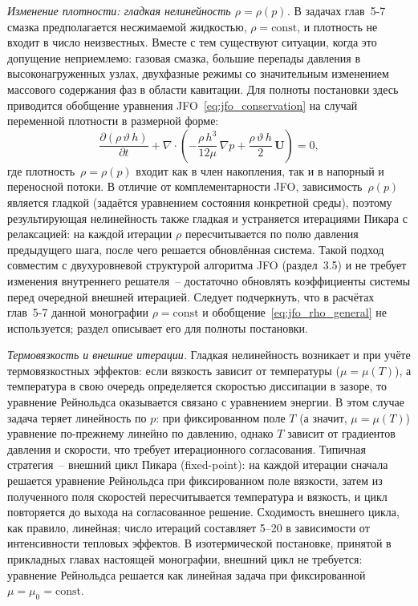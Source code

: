 \textit{Изменение плотности: гладкая нелинейность
$\rho = \rho(p)$.}
В задачах глав~5-7 смазка предполагается несжимаемой
жидкостью, $\rho = \mathrm{const}$, и плотность не входит
в число неизвестных. Вместе с тем существуют ситуации, когда
это допущение неприемлемо: газовая смазка, большие перепады
давления в высоконагруженных узлах, двухфазные режимы
со значительным изменением массового содержания фаз в области
кавитации. Для полноты постановки здесь приводится обобщение
уравнения JFO~\eqref{eq:jfo_conservation} на случай переменной
плотности в размерной форме:
\begin{equation}
  \frac{\partial (\rho\,\vartheta\,h)}{\partial t}
  + \nabla\cdot\!\left(
      -\frac{\rho\,h^3}{12\mu}\,\nabla p
      + \frac{\rho\,\vartheta\,h}{2}\,\mathbf{U}
    \right) = 0,
  \label{eq:jfo_rho_general}
\end{equation}
где плотность~$\rho = \rho(p)$ входит как в член накопления,
так и в напорный и переносной потоки. В отличие от
комплементарности JFO, зависимость~$\rho(p)$ является гладкой
(задаётся уравнением состояния конкретной среды), поэтому результирующая нелинейность также гладкая
и устраняется итерациями Пикара с релаксацией: на каждой
итерации $\rho$ пересчитывается по полю давления предыдущего
шага, после чего решается обновлённая система. Такой подход
совместим с двухуровневой структурой алгоритма JFO
(раздел~3.5) и не требует изменения внутреннего
решателя~-- достаточно обновлять коэффициенты системы перед
очередной внешней итерацией. Следует подчеркнуть, что
в расчётах глав~5-7 данной монографии
$\rho = \mathrm{const}$
и обобщение~\eqref{eq:jfo_rho_general} не используется;
раздел описывает его для полноты постановки.

\textit{Термовязкость и внешние итерации.}
Гладкая нелинейность возникает и при учёте термовязкостных
эффектов: если вязкость зависит от температуры
($\mu = \mu(T)$), а температура в свою очередь определяется
скоростью диссипации в зазоре, то уравнение Рейнольдса
оказывается связано с уравнением энергии. В этом случае задача
теряет линейность по $p$: при фиксированном поле $T$ (а значит,
$\mu = \mu(T)$) уравнение по-прежнему линейно по давлению,
однако $T$ зависит от градиентов давления и скорости, что
требует итерационного согласования. Типичная стратегия~--
внешний цикл Пикара (fixed-point): на каждой итерации сначала
решается уравнение Рейнольдса при фиксированном поле вязкости,
затем из полученного поля скоростей пересчитывается температура
и вязкость, и цикл повторяется до выхода на согласованное
решение. Сходимость внешнего цикла, как правило, линейная;
число итераций составляет 5--20 в зависимости от интенсивности
тепловых эффектов. В изотермической постановке, принятой
в прикладных главах настоящей монографии, внешний цикл
не требуется: уравнение Рейнольдса решается как линейная
задача при фиксированной $\mu = \mu_0 = \mathrm{const}$.

